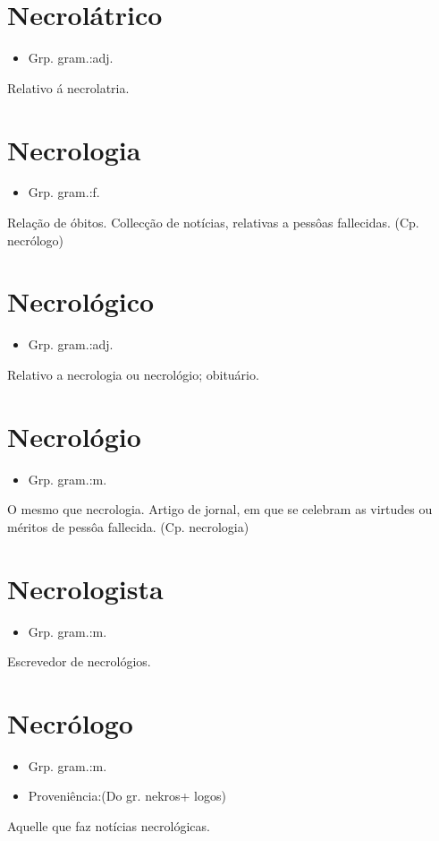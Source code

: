 \section{Necrolátrico}
\begin{itemize}
\item {Grp. gram.:adj.}
\end{itemize}
Relativo á necrolatria.
\section{Necrologia}
\begin{itemize}
\item {Grp. gram.:f.}
\end{itemize}
Relação de óbitos.
Collecção de notícias, relativas a pessôas fallecidas.
(Cp. \textunderscore necrólogo\textunderscore )
\section{Necrológico}
\begin{itemize}
\item {Grp. gram.:adj.}
\end{itemize}
Relativo a necrologia ou necrológio; obituário.
\section{Necrológio}
\begin{itemize}
\item {Grp. gram.:m.}
\end{itemize}
O mesmo que \textunderscore necrologia\textunderscore .
Artigo de jornal, em que se celebram as virtudes ou méritos de pessôa fallecida.
(Cp. \textunderscore necrologia\textunderscore )
\section{Necrologista}
\begin{itemize}
\item {Grp. gram.:m.}
\end{itemize}
Escrevedor de necrológios.
\section{Necrólogo}
\begin{itemize}
\item {Grp. gram.:m.}
\end{itemize}
\begin{itemize}
\item {Proveniência:(Do gr. \textunderscore nekros\textunderscore  + \textunderscore logos\textunderscore )}
\end{itemize}
Aquelle que faz notícias necrológicas.
